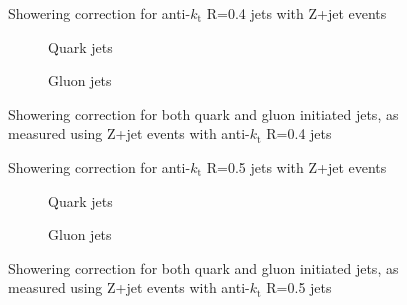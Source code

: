 \clearpage
\begin{figure}[!ht]
 \centering
 \caption[Showering correction for anti-$k_{\mathrm t}$ R=0.4 jets with Z+jet events]
 {\small Showering correction for anti-$k_{\mathrm t}$ R=0.4 jets with Z+jet events}
 \label{plot:ZJetShowering4App}
\end{figure}

\begin{figure}[!ht]
 \centering
 \begin{subfigure}{.5\textwidth}
  \centering
  \caption{Quark jets}
 \end{subfigure}%
 \begin{subfigure}{.5\textwidth}
  \centering
  \caption{Gluon jets}
 \end{subfigure}
 \caption[Quark/gluon jet showering correction, anti-$k_{\mathrm t}$ R=0.4, Z+jet]
 {\small Showering correction for both quark and gluon initiated jets, as measured using Z+jet events with anti-$k_{\mathrm t}$ R=0.4 jets}
 \label{plot:ZJetShoweringFlav4App}
\end{figure}

\clearpage
\begin{figure}[!ht]
 \centering
 \caption[Showering correction for anti-$k_{\mathrm t}$ R=0.5 jets with Z+jet events]
 {\small Showering correction for anti-$k_{\mathrm t}$ R=0.5 jets with Z+jet events}
 \label{plot:ZJetShowering5App}
\end{figure}

\begin{figure}[!ht]
 \centering
 \begin{subfigure}{.5\textwidth}
  \centering
  \caption{Quark jets}
 \end{subfigure}%
 \begin{subfigure}{.5\textwidth}
  \centering
  \caption{Gluon jets}
 \end{subfigure}
 \caption[Quark/gluon jet showering correction, anti-$k_{\mathrm t}$ R=0.5, Z+jet]
 {\small Showering correction for both quark and gluon initiated jets, as measured using Z+jet events with anti-$k_{\mathrm t}$ R=0.5 jets}
 \label{plot:ZJetShoweringFlav5App}
\end{figure}

